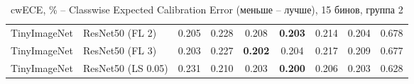\begin{table}[h!]
{\begin{tabular}{llccccccc}
TinyImageNet &             ResNet50 (FL 2) &         0.205 &                  0.228 &                  0.208 & \textbf{0.203} &                  0.214 &                  0.204 &                  0.678 \\
TinyImageNet &             ResNet50 (FL 3) &         0.203 &                  0.227 & \textbf{0.202} &                  0.204 &                  0.217 &                  0.209 &                  0.677 \\
TinyImageNet &          ResNet50 (LS 0.05) &         0.231 &                  0.210 &                  0.203 & \textbf{0.200} &                  0.206 &                  0.203 &                  0.628 \\
\bottomrule
\end{tabular}%
}
\caption{cwECE, \% -- Classwise Expected Calibration Error (меньше -- лучше), 15 бинов, группа 2}
\label{tab:metrics:cwECE_2}
\end{table}
